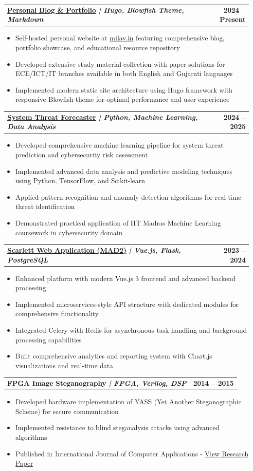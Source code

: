 \documentclass[11pt,a4paper]{article}
\makeatletter
\newcommand{\resumeItem}[1]{
    \item\small{#1 \vspace{-1pt}}
}
\newcommand{\resumeProjectHeading}[2]{
    \vspace{-1pt}\item
    \begin{tabular*}{0.97\textwidth}{l@{\extracolsep{\fill}}r}
        \small\textbf{\color{secondary}#1} & \textbf{\color{mediumgray}\small #2} \\
    \end{tabular*}\vspace{-2pt}
}
\newcommand{\resumeItemListStart}{\begin{itemize}[leftmargin=0.25in]}
\newcommand{\resumeItemListEnd}{\end{itemize}\vspace{-3pt}}
\makeatother
\begin{document}
\resumeProjectHeading
{\textbf{\href{https://github.com/milavdabgar/milav-blowfish}{Personal Blog \& Portfolio}} \textit{| Hugo, Blowfish Theme, Markdown}}{2024 -- Present}
\resumeItemListStart
\resumeItem{Self-hosted personal website at \href{https://milav.in/}{milav.in} featuring comprehensive blog, portfolio showcase, and educational resource repository}
\resumeItem{Developed extensive study material collection with paper solutions for ECE/ICT/IT branches available in both English and Gujarati languages}
\resumeItem{Implemented modern static site architecture using Hugo framework with responsive Blowfish theme for optimal performance and user experience}
\resumeItemListEnd

\resumeProjectHeading
{\textbf{\href{https://github.com/milavdabgar/MLP-Project}{System Threat Forecaster}} \textit{| Python, Machine Learning, Data Analysis}}{2024 -- 2025}
\resumeItemListStart
\resumeItem{Developed comprehensive machine learning pipeline for system threat prediction and cybersecurity risk assessment}
\resumeItem{Implemented advanced data analysis and predictive modeling techniques using Python, TensorFlow, and Scikit-learn}
\resumeItem{Applied pattern recognition and anomaly detection algorithms for real-time threat identification}
\resumeItem{Demonstrated practical application of IIT Madras Machine Learning coursework in cybersecurity domain}
\resumeItemListEnd

\resumeProjectHeading
{\textbf{\href{https://github.com/milavdabgar/21f1005510-mad2}{Scarlett Web Application (MAD2)}} \textit{| Vue.js, Flask, PostgreSQL}}{2023 -- 2024}
\resumeItemListStart
\resumeItem{Enhanced platform with modern Vue.js 3 frontend and advanced backend processing}
\resumeItem{Implemented microservices-style API structure with dedicated modules for comprehensive functionality}
\resumeItem{Integrated Celery with Redis for asynchronous task handling and background processing capabilities}
\resumeItem{Built comprehensive analytics and reporting system with Chart.js visualizations and real-time data}
\resumeItemListEnd

\resumeProjectHeading
{\textbf{FPGA Image Steganography} \textit{| FPGA, Verilog, DSP}}{2014 -- 2015}
\resumeItemListStart
\resumeItem{Developed hardware implementation of YASS (Yet Another Steganographic Scheme) for secure communication}
\resumeItem{Implemented resistance to blind steganalysis attacks using advanced algorithms}
\resumeItem{Published in International Journal of Computer Applications - \href{https://www.ijcaonline.org/archives/volume120/number9/21259-4125}{\textcolor{primary}{View Research Paper}}}
\resumeItemListEnd
\end{document}

